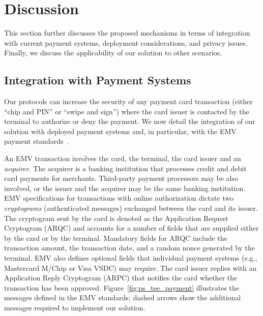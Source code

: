 \section{Discussion}
\label{sec:ps_tee_discussion}

This section further discusses the proposed mechanisms in terms of integration
with current payment systems, deployment considerations, and privacy
issues. Finally, we discuss the applicability of our solution to other
scenarios.

\subsection{Integration with Payment Systems}

Our protocols can increase the security of any payment card transaction (either
``chip and PIN'' or ``swipe and sign'') where the card issuer is contacted by
the terminal to authorize or deny the payment.  We now detail the integration of
our solution with deployed payment systems and, in particular, with the EMV
payment standards~\cite{emv}.

An EMV transaction involves the card, the terminal, the card issuer and an
\emph{acquirer}. The acquirer is a banking institution that processes credit
and debit card payments for merchants. Third-party payment processors may be
also involved, or the issuer and the acquirer may be the same banking
institution. EMV specifications for transactions with online authorization
dictate two \emph{cryptograms} (authenticated messages) exchanged between the
card and its issuer. The cryptogram sent by the card is denoted as the
Application Request Cryptogram (ARQC) and accounts for a number of fields that
are supplied either by the card or by the terminal. Mandatory fields for ARQC
include the transaction amount, the transaction date, and a random nonce
generated by the terminal. EMV also defines optional fields that individual
payment systems (e.g., Mastercard M/Chip or Visa VSDC) may require. The card
issuer replies with an Application Reply Cryptogram (ARPC) that notifies the
card whether the transaction has been approved. Figure~\ref{fig:ps_tee_payment}
illustrates the messages defined in the EMV standards; dashed arrows show the
additional messages required to implement our solution.

